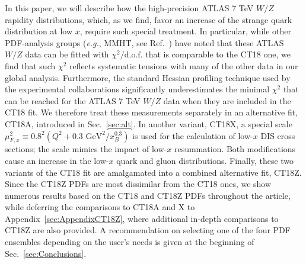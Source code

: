 In this paper, we will describe how the high-precision ATLAS 7 TeV $W/Z$ rapidity distributions, which, as we find, favor an increase of the strange quark distribution at low $x$, require such special treatment. In particular, while other PDF-analysis groups ({\it e.g.}, MMHT, see Ref.~\cite{Thorne:2019mpt}) have noted that these ATLAS $W/Z$ data can be fitted with  $\chi^2/\mathrm{d.o.f.}$ that is comparable to the CT18 one, we find that such $\chi^2$ reflects systematic tensions with many of the other data in our global analysis.
Furthermore, the standard Hessian profiling technique used by the experimental collaborations significantly underestimates the minimal $\chi^2$ that can be reached for the ATLAS 7 TeV $W/Z$ data when they are included in the CT18 fit.
We therefore treat these measurements separately in an alternative fit, CT18A, introduced in Sec.~\ref{sec:alt}.
In another variant, CT18X, a special scale $\mu^2_{F,x} \equiv 0.8^2 \left(Q^2 + 0.3\mbox{ GeV}^2/x_B^{0.3}\right)$ is used for the calculation of low-$x$ DIS cross sections; the scale mimics the impact of low-$x$ resummation. Both modifications cause an increase in the low-$x$ quark and gluon distributions. Finally, these two variants of the CT18 fit are
amalgamated into a combined alternative fit, CT18Z. Since the CT18Z PDFs are most dissimilar from the CT18 ones, we show numerous results based on the CT18 and CT18Z PDFs throughout the article, while deferring the comparisons to CT18A and X to  Appendix~\ref{sec:AppendixCT18Z}, where additional in-depth comparisons to CT18Z are also provided. A recommendation on selecting one of the four PDF ensembles depending on the user's needs is given at the beginning of Sec.~\ref{sec:Conclusions}.

